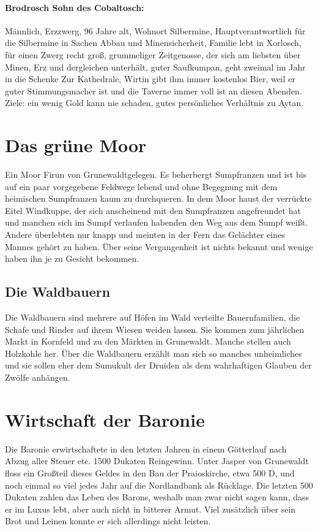 \paragraph{Brodrosch Sohn des Cobaltosch:} Männlich, Erzzwerg, 96 Jahre alt, Wohnort Silbermine, Hauptverantwortlich für die Silbermine in Sachen Abbau und Minensicherheit, Familie lebt in Xorlosch, für einen Zwerg recht groß, grummeliger Zeitgenosse, der sich am liebsten über Minen, Erz und dergleichen unterhält, guter Saufkumpan, geht zweimal im Jahr in die Schenke Zur Kathedrale, Wirtin gibt ihm immer kostenlos Bier, weil er guter Stimmungsmacher ist und die Taverne immer voll ist an diesen Abenden. Ziele: ein wenig Gold kann nie schaden, gutes persönliches Verhältnis zu Aytan. 

\section{Das grüne Moor}
Ein Moor Firun von Grunewaldtgelegen. Es beherbergt Sumpfranzen und ist bis auf ein paar vorgegebene Feldwege lebend und ohne Begegnung mit dem heimischen Sumpfranzen  kaum zu durchqueren. In dem Moor haust der verrückte Eitel Windkuppe, der sich anscheinend mit den Sumpfranzen angefreundet hat und manchen sich im Sumpf verlaufen habenden den Weg aus dem Sumpf weißt. Andere überlebten nur knapp und meinten in der Fern das Gelächter eines Mannes gehört zu haben. Über seine Vergangenheit ist nichts bekannt und wenige haben ihn je zu Gesicht bekommen. 

\subsection{Die Waldbauern}
Die Waldbauern sind mehrere auf Höfen im Wald verteilte Bauernfamilien, die Schafe und Rinder auf ihrem Wiesen weiden lassen. Sie kommen zum jährlichen Markt in Kornfeld und zu den Märkten in Grunewaldt. Manche stellen auch Holzkohle her. Über die Waldbauern erzählt man sich so manches unheimliches und sie sollen eher dem Sumukult der Druiden als dem wahrhaftigen Glauben der Zwölfe anhängen.

\section{Wirtschaft der Baronie}
Die Baronie erwirtschaftete in den letzten Jahren in einem Götterlauf nach Abzug aller Steuer etc. 1500 Dukaten Reingewinn. Unter Jasper von Grunewaldt floss ein Großteil dieses Geldes in den Bau der Praioskirche, etwa 500 D, und noch einmal so viel jedes Jahr auf die Nordlandbank als Rücklage. Die letzten 500 Dukaten zahlen das Leben des Barons, weshalb man zwar nicht sagen kann, dass er im Luxus lebt, aber auch nicht in bitterer Armut. Viel zusätzlich über sein Brot und Leinen konnte er sich allerdings nicht leisten.

